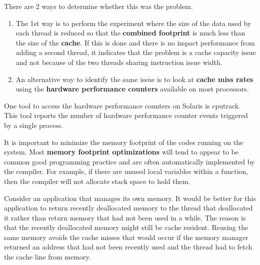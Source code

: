 \documentclass[12pt,a4paper]{report}
\begin{document}
\par
There are 2 ways to determine whether this was the problem.
\begin{enumerate}
	\item The 1st way is to perform the experiment where the size of the data used by each thread is reduced so that the \textbf{combined footprint} is much less than the size of the \textbf{cache}. If this is done and there is no impact performance from adding a second thread, it indicates that the problem is a cache capacity issue and not because of the two threads sharing instruction issue width.
	\item An alternative way to identify the same issue is to look at \textbf{cache miss rates} using the \textbf{hardware performance counters} available on most processors.
\end{enumerate}
One tool to access the hardware performance counters on Solaris is cputrack. This tool reports the number of hardware performance counter events triggered by a single process. 
\par
It is important to minimize the memory footprint of the codes running on the system. Most \textbf{memory footprint optimizations} will tend to appear to be common good programming practice and are often automatically implemented by the compiler. For example, if there are unused local variables within a function, then the compiler will not allocate stack space to hold them.
\par
Consider an application that manages its own memory. It would be better for this application to return recently deallocated memory to the thread that deallocated it rather than return memory that had not been used in a while. The reason is that the recently deallocated memory might still be cache resident. Reusing the same memory avoids the cache misses that would occur if the memory manager returned an address that had not been recently used and the thread had to fetch the cache line from memory.
\end{document}
